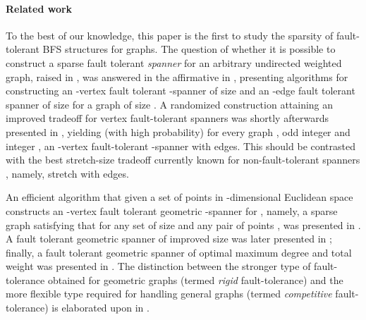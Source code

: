 \documentclass[12pt]{article}
\begin{document}
\paragraph{Related work}
To the best of our knowledge, this paper is the first to study
the sparsity of fault-tolerant BFS structures for graphs.
The question of whether it is possible to construct a sparse fault tolerant
\emph{spanner} for an arbitrary undirected weighted graph,
raised in \cite{CZ03},
was answered in the affirmative in \cite{CLPR09-span}, presenting algorithms
for constructing an -vertex fault tolerant -spanner
of size  and an
-edge fault tolerant  spanner of size 
for a graph of size .
A randomized construction attaining an improved tradeoff for vertex
fault-tolerant spanners was shortly afterwards presented in \cite{DK11},
yielding (with high probability) for every graph ,
odd integer  and integer , an -vertex fault-tolerant -spanner
with  edges.
This should be contrasted with the best stretch-size tradeoff currently
known for non-fault-tolerant spanners \cite{TZ01}, namely,
 stretch with  edges.

An efficient algorithm that given a set  of  points
in -dimensional Euclidean space constructs an -vertex
fault tolerant geometric -spanner for , namely,
a sparse graph  satisfying that
 for any set
 of size  and any pair of points ,
was presented in \cite{LNS98}. A fault tolerant geometric spanner
of improved size was later presented in \cite{L99}; finally,
a fault tolerant geometric spanner of optimal maximum degree
and total weight was presented in \cite{CZ03}.
The distinction between the stronger type of fault-tolerance obtained
for geometric graphs (termed {\em rigid} fault-tolerance)
and the more flexible type required for handling general graphs
(termed {\em competitive} fault-tolerance) is elaborated upon in \cite{P09}.
\end{document}
